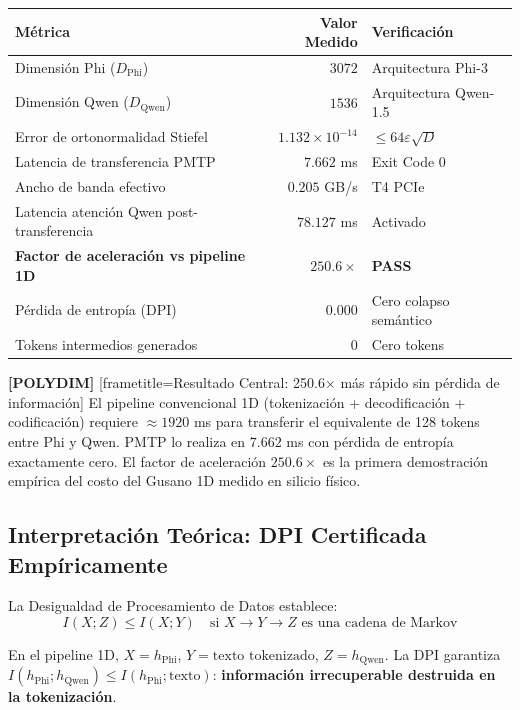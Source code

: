\begin{tabular}{@{}lrl@{}}
\hline
Métrica & Valor Medido & Verificación \\
\hline
Dimensión Phi ($D_{\text{Phi}}$)             & $3072$                         & Arquitectura Phi-3 \\
Dimensión Qwen ($D_{\text{Qwen}}$)           & $1536$                         & Arquitectura Qwen-1.5 \\
Error de ortonormalidad Stiefel              & $1.132 \times 10^{-14}$        & $\le 64\varepsilon\sqrt{D}$ \\
Latencia de transferencia PMTP               & $7.662$ ms                     & Exit Code 0 \\
Ancho de banda efectivo                      & $0.205$ GB/s                   & T4 PCIe \\
Latencia atención Qwen post-transferencia    & $78.127$ ms                    & Activado \\
\textbf{Factor de aceleración vs pipeline 1D}& $\mathbf{250.6\times}$         & \textbf{PASS} \\
Pérdida de entropía (DPI)                    & $0.000$                        & Cero colapso semántico \\
Tokens intermedios generados                 & $0$                            & Cero tokens \\
\hline
\end{tabular}


\textbf{[POLYDIM]} [frametitle={Resultado Central: 250.6$\times$ más rápido sin pérdida de información}]
El pipeline convencional 1D (tokenización + decodificación + codificación) requiere
$\approx 1920$ ms para transferir el equivalente de 128 tokens entre Phi y Qwen.
PMTP lo realiza en $7.662$ ms con pérdida de entropía exactamente cero.
El factor de aceleración $250.6\times$ es la primera demostración empírica
del costo del Gusano 1D medido en silicio físico.


\subsection{Interpretación Teórica: DPI Certificada Empíricamente}

La Desigualdad de Procesamiento de Datos establece:
\begin{equation}
  I(X; Z) \le I(X; Y) \quad \text{si } X \to Y \to Z \text{ es una cadena de Markov}
\end{equation}

En el pipeline 1D, $X = h_{\text{Phi}}$, $Y = \text{texto tokenizado}$, $Z = h_{\text{Qwen}}$.
La DPI garantiza $I(h_{\text{Phi}}; h_{\text{Qwen}}) \le I(h_{\text{Phi}}; \text{texto})$:
\textbf{información irrecuperable destruida en la tokenización}.

